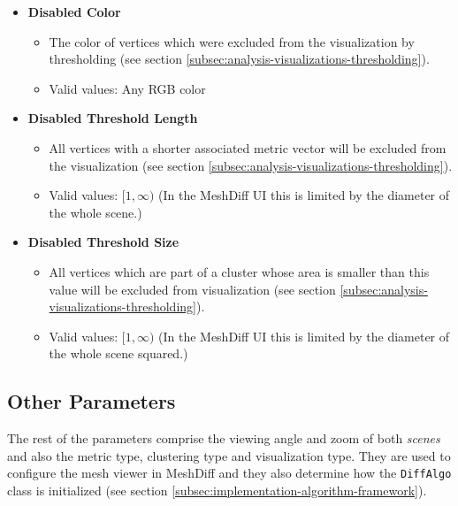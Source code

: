 \begin{itemize}
\item {\bf Disabled Color}
	\begin{itemize}
		\item The color of vertices which were excluded from the visualization by thresholding (see section \ref{subsec:analysis-visualizations-thresholding}).
		\item Valid values: Any RGB color
	\end{itemize}

\item {\bf Disabled Threshold Length}
	\begin{itemize}
		\item All vertices with a shorter associated metric vector will be excluded from the visualization (see section \ref{subsec:analysis-visualizations-thresholding}).
		\item Valid values: \([1, \infty)\) (In the MeshDiff UI this is limited by the diameter of the whole scene.)
	\end{itemize} 

\item {\bf Disabled Threshold Size}
	\begin{itemize}
		\item All vertices which are part of a cluster whose area is smaller than this value will be excluded from visualization (see section \ref{subsec:analysis-visualizations-thresholding}).
		\item Valid values: \([1, \infty)\) (In the MeshDiff UI this is limited by the diameter of the whole scene squared.)
	\end{itemize}
\end{itemize}

\subsection{Other Parameters}
\label{attch:parameter_desc-other_parameters}

The rest of the parameters comprise the viewing angle and zoom of both {\it scenes} and also the metric type, clustering type and visualization type. They are used to configure the mesh viewer in MeshDiff and they also determine how the \verb+DiffAlgo+ class is initialized (see section \ref{subsec:implementation-algorithm-framework}).


